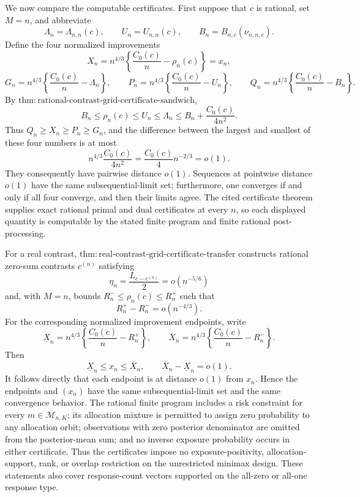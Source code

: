 We now compare the computable certificates.  First suppose that \(c\) is rational, set \(M=n\), and abbreviate
\[
 \Lambda_n=\Lambda_{n,n}(c),
 \qquad U_n=U_{n,n}(c),
 \qquad B_n=B_{n,c}(\nu_{n,n,c}).
\]
Define the four normalized improvements
\[
 X_n=n^{4/3}\left\{\frac{C_0(c)}n-\rho_n(c)\right\}=x_n,
\]
\[
 G_n=n^{4/3}\left\{\frac{C_0(c)}n-\Lambda_n\right\},
 \qquad
 P_n=n^{4/3}\left\{\frac{C_0(c)}n-U_n\right\},
 \qquad
 Q_n=n^{4/3}\left\{\frac{C_0(c)}n-B_n\right\}.
\]
By \(\mathrm{thm:rational\text{-}contrast\text{-}grid\text{-}certificate\text{-}sandwich}\),
\[
 B_n\leq\rho_n(c)\leq U_n\leq\Lambda_n
 \leq B_n+\frac{C_0(c)}{4n^2}.
\]
Thus \(Q_n\geq X_n\geq P_n\geq G_n\), and the difference between the largest and smallest of these four numbers is at most
\[
 n^{4/3}\frac{C_0(c)}{4n^2}
 =\frac{C_0(c)}4n^{-2/3}=o(1).
\]
They consequently have pairwise distance \(o(1)\).  Sequences at pointwise distance \(o(1)\) have the same subsequential-limit set; furthermore, one converges if and only if all four converge, and then their limits agree.  The cited certificate theorem supplies exact rational primal and dual certificates at every \(n\), so each displayed quantity is computable by the stated finite program and finite rational post-processing.

For a real contrast, \(\mathrm{thm:real\text{-}contrast\text{-}grid\text{-}certificate\text{-}transfer}\) constructs rational zero-sum contrasts \(c^{(n)}\) satisfying
\[
 \eta_n=\frac{L_{c-c^{(n)}}}{2}=o(n^{-5/6})
\]
and, with \(M=n\), bounds \(R_n^-\leq\rho_n(c)\leq R_n^+\) such that
\[
 R_n^+-R_n^-=o(n^{-4/3}).
\]
For the corresponding normalized improvement endpoints, write
\[
 \underline X_n=n^{4/3}\left\{\frac{C_0(c)}n-R_n^+\right\},
 \qquad
 \overline X_n=n^{4/3}\left\{\frac{C_0(c)}n-R_n^-\right\}.
\]
Then
\[
 \underline X_n\leq x_n\leq\overline X_n,
 \qquad
 \overline X_n-\underline X_n=o(1).
\]
It follows directly that each endpoint is at distance \(o(1)\) from \(x_n\).  Hence the endpoints and \((x_n)\) have the same subsequential-limit set and the same convergence behavior.  The rational finite program includes a risk constraint for every \(m\in\mathcal M_{n,K}\); its allocation mixture is permitted to assign zero probability to any allocation orbit; observations with zero posterior denominator are omitted from the posterior-mean sum; and no inverse exposure probability occurs in either certificate.  Thus the certificates impose no exposure-positivity, allocation-support, rank, or overlap restriction on the unrestricted minimax design.  These statements also cover response-count vectors supported on the all-zero or all-one response type.

